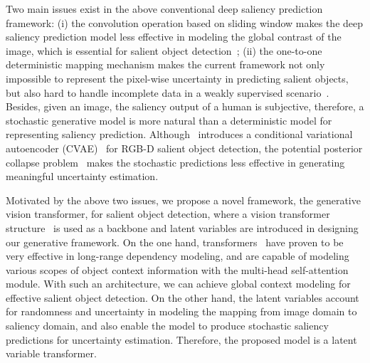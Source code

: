 \documentclass{article}
\begin{document}
Two main issues exist in the above conventional deep saliency prediction framework: (i) the convolution operation based on sliding window makes the deep saliency prediction model less effective in modeling the global contrast of the image, which is essential for salient object detection~\cite{global_contrast}; (ii) the one-to-one deterministic mapping mechanism makes the current framework not only impossible to represent the pixel-wise uncertainty in predicting salient objects, but also hard to handle incomplete data in a weakly supervised scenario~\cite{jing2020weakly}. 
Besides, given an image, the saliency output of a human is subjective, therefore, a stochastic generative model is more natural than a deterministic model for representing saliency prediction. Although~\cite{ucnet_sal} introduces a conditional variational autoencoder (CVAE)~\cite{structure_output} for RGB-D salient object detection, the potential posterior collapse problem~\cite{Lagging_Inference_Networks} makes the stochastic predictions less effective in generating meaningful uncertainty estimation.

 Motivated by the above two issues, we propose a novel framework, the generative vision transformer, for salient object detection, where a vision transformer structure~\cite{liu2021swin} is used as a backbone and latent variables are introduced in designing our generative framework. 
On the one hand, transformers~\cite{transformer_nips} have proven to be very effective in long-range dependency modeling, and are capable of modeling various scopes of object context information with the multi-head self-attention module. With such an architecture,
we can achieve global context modeling for effective salient object detection. On the other hand, the latent variables account for randomness and uncertainty in modeling the mapping from image domain to saliency domain, and also enable the model to produce stochastic saliency predictions for uncertainty estimation. Therefore, the proposed model is a latent variable transformer. 
\end{document}
